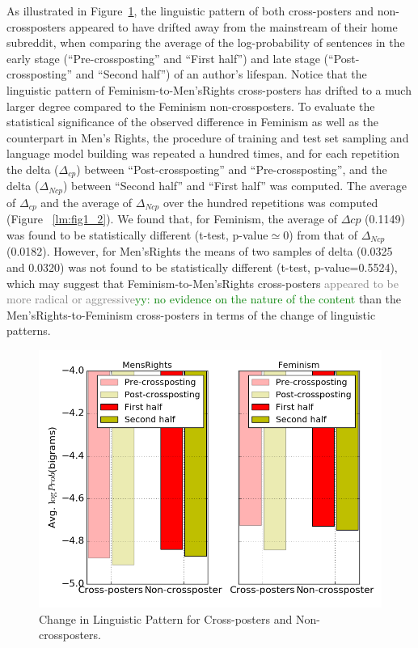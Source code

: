 \documentclass[letterpaper]{article}
\newcommand{\yy}[1]{{\textcolor{green}{yy: #1}}}
\newcommand{\del}[1]{{\textcolor{gray}{#1}}}
\begin{document}
As illustrated in Figure~\ref{lm:fig1_1}, the linguistic pattern of both cross-posters and non-crossposters appeared to have drifted away from the mainstream of their home subreddit, when comparing the average of the log-probability of sentences in the early stage (``Pre-crossposting'' and ``First half'') and late stage (``Post-crossposting'' and ``Second half'') of an author's lifespan. Notice that the linguistic pattern of Feminism-to-Men'sRights cross-posters has drifted to a much larger degree compared to the Feminism non-crossposters. To evaluate the statistical significance of the observed difference in Feminism as well as the counterpart in Men's Rights, the procedure of training and test set sampling and language model building was repeated a hundred times, and for each repetition the delta ($\Delta_{cp}$) between ``Post-crossposting'' and ``Pre-crossposting'', and the delta ($\Delta_{Ncp}$) between ``Second half'' and ``First half'' was computed. The average of $\Delta_{cp}$ and the average of $\Delta_{Ncp}$ over the hundred repetitions was computed (Figure ~\ref{lm:fig1_2}). We found that, for Feminism, the average of $\Delta{cp}$ (0.1149) was found to be statistically different (t-test, p-value$\simeq 0$) from that of $\Delta_{Ncp}$ (0.0182). However, for Men'sRights the means of two samples of delta (0.0325 and 0.0320) was not found to be statistically different (t-test, p-value=0.5524), which may suggest that Feminism-to-Men'sRights cross-posters \del{appeared to be more radical or aggressive}\yy{no evidence on the nature of the content} than the Men'sRights-to-Feminism cross-posters in terms of the change of linguistic patterns.

\begin{figure}[ht]
    \centering
    \includegraphics[scale = 0.4]{LM_figure_1_1}
    \caption{Change in Linguistic Pattern for Cross-posters and Non-crossposters.}
    \label{lm:fig1_1}
\end{figure}
\end{document}
